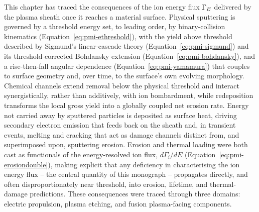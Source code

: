 This chapter has traced the consequences of the ion energy flux $\Gamma_{E}$ delivered by the plasma sheath once it reaches a material surface. Physical sputtering is governed by a threshold energy set, to leading order, by binary-collision kinematics (Equation~\eqref{eq:pmi-ethreshold}), with the yield above threshold described by Sigmund's linear-cascade theory (Equation~\eqref{eq:pmi-sigmund}) and its threshold-corrected Bohdansky extension (Equation~\eqref{eq:pmi-bohdansky}), and a rise-then-fall angular dependence (Equation~\eqref{eq:pmi-yamamura}) that couples to surface geometry and, over time, to the surface's own evolving morphology. Chemical channels extend removal below the physical threshold and interact synergistically, rather than additively, with ion bombardment, while redeposition transforms the local gross yield into a globally coupled net erosion rate. Energy not carried away by sputtered particles is deposited as surface heat, driving secondary electron emission that feeds back on the sheath and, in transient events, melting and cracking that act as damage channels distinct from, and superimposed upon, sputtering erosion. Erosion and thermal loading were both cast as functionals of the energy-resolved ion flux, $d\Gamma_i/dE$ (Equation~\eqref{eq:pmi-erosiondouble}), making explicit that any deficiency in characterising the ion energy flux -- the central quantity of this monograph -- propagates directly, and often disproportionately near threshold, into erosion, lifetime, and thermal-damage predictions. These consequences were traced through three domains: electric propulsion, plasma etching, and fusion plasma-facing components.
